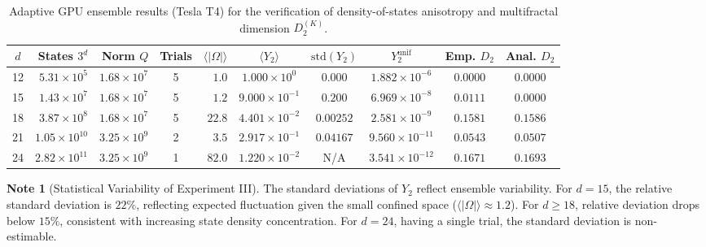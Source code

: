 \documentclass[11pt,a4paper]{article}
\theoremstyle{plain}
\theoremstyle{definition}
\newtheorem{remark}[teorema]{Note}
\numberwithin{equation}{section}
\begin{document}
\begin{table}[htbp]
\centering
\caption{Adaptive GPU ensemble results (Tesla T4) for the verification of density-of-states anisotropy and multifractal dimension $D_2^{(K)}$.}
\label{tab:exp3_anisotropia}
\small
\begin{tabular}{c r r c r c c c c c}
\toprule
\textbf{$d$} & \textbf{States $3^d$} & \textbf{Norm $Q$} & \textbf{Trials} & \textbf{$\langle |\Omega| \rangle$} & \textbf{$\langle Y_2 \rangle$} & \textbf{$\text{std}(Y_2)$} & \textbf{$Y_2^{\text{unif}}$} & \textbf{Emp. $D_2$} & \textbf{Anal. $D_2$} \\
\midrule
12 & $5.31 \times 10^5$ & $1.68 \times 10^7$ & 5 & $1.0$ & $1.000 \times 10^0$ & $0.000$ & $1.882 \times 10^{-6}$ & $0.0000$ & $0.0000$ \\
15 & $1.43 \times 10^7$ & $1.68 \times 10^7$ & 5 & $1.2$ & $9.000 \times 10^{-1}$ & $0.200$ & $6.969 \times 10^{-8}$ & $0.0111$ & $0.0000$ \\
18 & $3.87 \times 10^8$ & $1.68 \times 10^7$ & 5 & $22.8$ & $4.401 \times 10^{-2}$ & $0.00252$ & $2.581 \times 10^{-9}$ & $0.1581$ & $0.1586$ \\
21 & $1.05 \times 10^{10}$ & $3.25 \times 10^9$ & 2 & $3.5$ & $2.917 \times 10^{-1}$ & $0.04167$ & $9.560 \times 10^{-11}$ & $0.0543$ & $0.0507$ \\
24 & $2.82 \times 10^{11}$ & $3.25 \times 10^9$ & 1 & $82.0$ & $1.220 \times 10^{-2}$ & N/A & $3.541 \times 10^{-12}$ & $0.1671$ & $0.1693$ \\
\bottomrule
\end{tabular}
\end{table}

\begin{remark}[Statistical Variability of Experiment III]
\label{rem:variabilidad_exp3}
The standard deviations of $Y_2$ reflect ensemble variability. For $d = 15$, the relative standard deviation is $22\%$, reflecting expected fluctuation given the small confined space ($\langle |\Omega| \rangle \approx 1.2$). For $d \ge 18$, relative deviation drops below $15\%$, consistent with increasing state density concentration. For $d = 24$, having a single trial, the standard deviation is non-estimable.
\end{remark}
\end{document}
